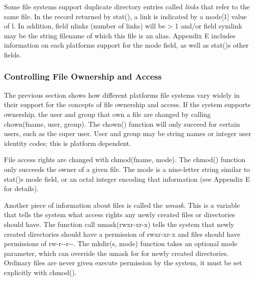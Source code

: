 Some file systems support duplicate directory entries called
\textit{links} that refer to the same file. In the record returned by
\textsf{stat()}, a link is indicated by a
\textsf{mode[1]} value of \textsf{{\textquotedbl}l{\textquotedbl}}. In
addition, field \textsf{nlinks} ({\textquotedbl}number of
links{\textquotedbl}) will be \textsf{{\textgreater} 1} and/or field
\textsf{symlink} may be the string filename of which this file is an
alias. Appendix E includes information on each
platform{\textquotesingle}s support for the \textsf{mode} field, as
well as \textsf{stat()}{\textquotesingle}s other fields.

\subsubsection[Controlling File Ownership and Access]{Controlling File
Ownership and Access}

The previous section shows how different
platforms{\textquotesingle} file systems vary widely in their support
for the concepts of file ownership and access. If the system supports
ownership, the user and group that own a file are changed by calling
\textsf{chown(fname, user, group)}. The \textsf{chown()}
function will only succeed for certain users, such as the super user.
User and group may be string names or integer user identity codes; this
is platform dependent.

File access rights are changed with \textsf{chmod(fname, mode)}. The
\textsf{chmod()} function only succeeds the owner of a
given file. The \textsf{mode} is a nine-letter string similar to
\textsf{stat()}{\textquotesingle}s mode field, or an octal integer
encoding that information (see Appendix E for details).

Another piece of information about files is called the
\textit{umask}. This is a variable that tells the system
what access rights any newly created files or directories should have.
The function call
\textsf{umask({\textquotedbl}rwxr-xr-x{\textquotedbl})} tells the
system that newly created directories should have a permission of
\textsf{{\textquotedbl}rwxr-xr-x{\textquotedbl}} and files should have
permissions of \textsf{{\textquotedbl}rw-r-{}-r-{}-{\textquotedbl}}.
The \textsf{mkdir(s, mode)} function takes an optional mode parameter,
which can override the umask for for newly created directories.
Ordinary files are never given execute permission by the system, it
must be set explicitly with \textsf{chmod()}.


